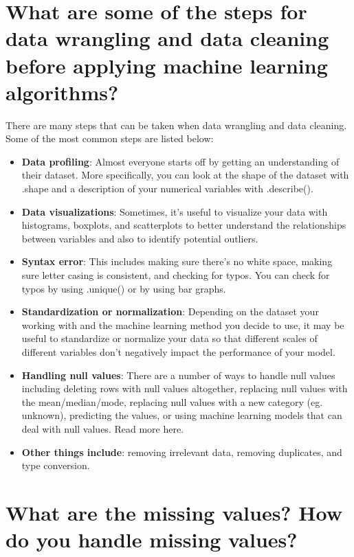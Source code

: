 \documentclass[
]{book}
\begin{document}
\hypertarget{what-are-some-of-the-steps-for-data-wrangling-and-data-cleaning-before-applying-machine-learning-algorithms}{%
\section{What are some of the steps for data wrangling and data cleaning before applying machine learning algorithms?}\label{what-are-some-of-the-steps-for-data-wrangling-and-data-cleaning-before-applying-machine-learning-algorithms}}

There are many steps that can be taken when data wrangling and data cleaning. Some of the most common steps are listed below:

\begin{itemize}
\item
  \textbf{Data profiling}: Almost everyone starts off by getting an understanding of their dataset. More specifically, you can look at the shape of the dataset with .shape and a description of your numerical variables with .describe().
\item
  \textbf{Data visualizations}: Sometimes, it's useful to visualize your data with histograms, boxplots, and scatterplots to better understand the relationships between variables and also to identify potential outliers.
\item
  \textbf{Syntax error}: This includes making sure there's no white space, making sure letter casing is consistent, and checking for typos. You can check for typos by using .unique() or by using bar graphs.
\item
  \textbf{Standardization or normalization}: Depending on the dataset your working with and the machine learning method you decide to use, it may be useful to standardize or normalize your data so that different scales of different variables don't negatively impact the performance of your model.
\item
  \textbf{Handling null values}: There are a number of ways to handle null values including deleting rows with null values altogether, replacing null values with the mean/median/mode, replacing null values with a new category (eg. unknown), predicting the values, or using machine learning models that can deal with null values. Read more here.
\item
  \textbf{Other things include}: removing irrelevant data, removing duplicates, and type conversion.
\end{itemize}

\hypertarget{what-are-the-missing-values-how-do-you-handle-missing-values}{%
\section{What are the missing values? How do you handle missing values?}\label{what-are-the-missing-values-how-do-you-handle-missing-values}}
\end{document}
